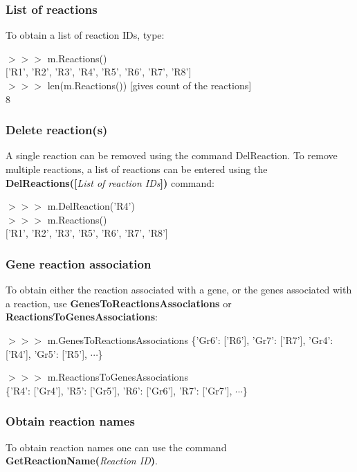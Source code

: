 \subsubsection{List of reactions}
To obtain a list of reaction IDs, type:

\begin{framed}
$>>>$ m.Reactions()\\
$[$'R1', 'R2', 'R3', 'R4', 'R5', 'R6', 'R7', 'R8'$]$\\

$>>>$ len(m.Reactions()) [gives count of the reactions]\\
8 
\end{framed}
\subsubsection{Delete reaction(s)}
A single reaction can be removed using the command DelReaction. To remove multiple reactions, a list of reactions can be entered using the \textbf{DelReactions([}\textit{List of reaction IDs}\textbf{])} command:

\begin{framed}
$>>>$ m.DelReaction('R4')\\
$>>>$ m.Reactions()\\
$[$'R1', 'R2', 'R3', 'R5', 'R6', 'R7', 'R8'$]$
\end{framed}

\subsubsection{Gene reaction association}
To obtain either the reaction associated with a gene, or the genes associated with a reaction, use \textbf{GenesToReactionsAssociations} or \textbf{ReactionsToGenesAssociations}:

\begin{framed}
$>>>$ m.GenesToReactionsAssociations
\{'Gr6': ['R6'], 'Gr7': ['R7'], 'Gr4': ['R4'], 'Gr5': ['R5'], $\cdots$\}

$>>>$ m.ReactionsToGenesAssociations\\
\{'R4': ['Gr4'], 'R5': ['Gr5'], 'R6': ['Gr6'], 'R7': ['Gr7'], $\cdots$\}
\end{framed}


\subsubsection{Obtain reaction names}
To obtain reaction names one can use the command \textbf{GetReactionName(}\textit{Reaction ID}\textbf{)}.

